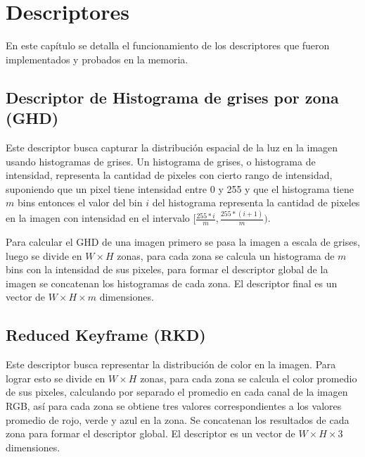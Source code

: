 \chapter{Descriptores}
 En este capítulo se detalla el funcionamiento de los descriptores que fueron implementados y probados en la memoria.
\section{Descriptor de Histograma de grises por zona (GHD)}
Este descriptor busca capturar la distribución espacial de la luz en la imagen usando histogramas de grises. Un histograma de grises, o histograma de intensidad, representa la cantidad de pixeles con cierto rango de intensidad, suponiendo que un pixel tiene intensidad entre 0 y 255 y que el histograma tiene $m$ bins entonces el valor del bin $i$ del histograma representa la cantidad de pixeles en la imagen con intensidad en el intervalo $[\frac{255*i}{m},\frac{255*(i+1)}{m})$.

Para calcular el GHD de una imagen primero se pasa la imagen a escala de grises, luego se divide en $W \times H$ zonas, para cada zona se calcula un histograma de $m$ bins con la intensidad de sus pixeles, para formar el descriptor global de la imagen se concatenan los histogramas de cada zona. El descriptor final es un vector de $W \times H \times m$ dimensiones.

\section{Reduced Keyframe (RKD)}
Este descriptor busca representar la distribución de color en la imagen. Para lograr esto se divide en $W \times H$ zonas, para cada zona se calcula el color promedio de sus pixeles, calculando por separado el promedio en cada canal de la imagen RGB, así para cada zona se obtiene tres valores correspondientes a los valores promedio de rojo, verde y azul en la zona. Se concatenan los resultados de cada zona para formar el descriptor global. El descriptor es un vector de $W \times H \times 3$ dimensiones.

